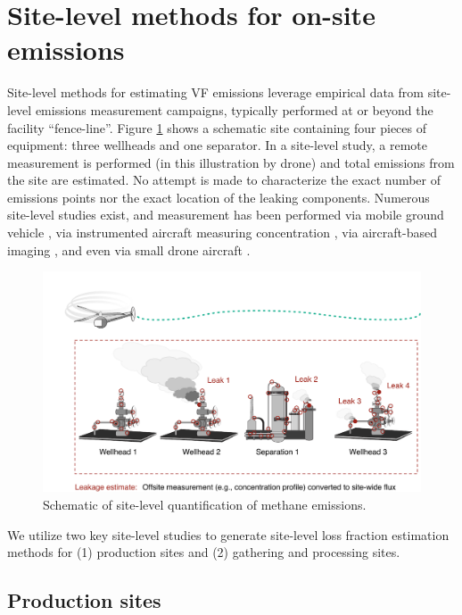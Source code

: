 \documentclass[11pt]{report}
\begin{document}
{{{{\section{Site-level methods for on-site emissions}

Site-level methods for estimating VF emissions leverage empirical data from site-level emissions measurement campaigns, typically performed at or beyond the facility ``fence-line''. Figure \ref{fig:Site_VF} shows a schematic site containing four pieces of equipment: three wellheads and one separator. In a site-level study, a remote measurement is performed (in this illustration by drone) and total emissions from the site are estimated. No attempt is made to characterize the exact number of emissions points nor the exact location of the leaking components. Numerous site-level studies exist, and measurement has been performed via mobile ground vehicle \cite{Brantley2014, Goetz2017, Lan2015, Omara2016, Yacovitch2015, Rella2015, Robertson2017, Bell2017}, via instrumented aircraft measuring concentration \cite{Conley2016, Schwietzke2017, Englander2018, Lavoie2015, Lavoie2017a, Lavoie2017b, Mehrotra2017}, via aircraft-based imaging \cite{Frankenberg2016}, and even via small drone aircraft \cite{Nathan2015}.


\begin{figure}[t]
\includegraphics[width=1\columnwidth]{images/Site_VF.pdf}
\caption{Schematic of site-level quantification of methane emissions.}
\label{fig:Site_VF}
\end{figure}

We utilize two key site-level studies to generate site-level loss fraction estimation methods for (1) production sites and (2) gathering and processing sites.

\subsection{Production sites}

}}}}
\end{document}
